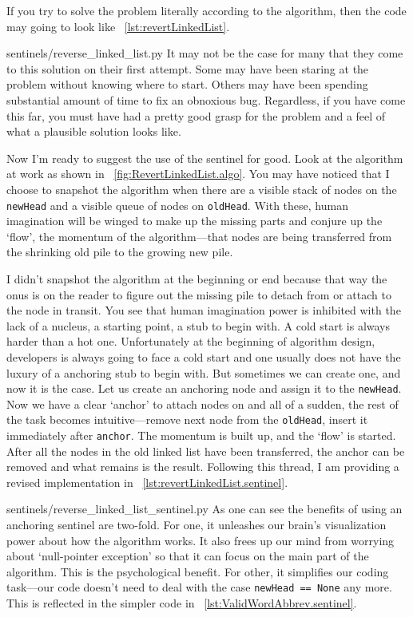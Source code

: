 \documentclass[oneside,11pt]{book}
\theoremstyle{definition}
\theoremstyle{remark}
\newcommand{\code}[1]{\mbox{\lstinline{#1}}}
\begin{document}
If you try to solve the problem literally according to the algorithm,
then the code may going to look like ~\autoref{lst:revertLinkedList}.

{sentinels/reverse_linked_list.py}
It may not be the case for many that they come to this solution on their first attempt.
Some may have been staring at the problem without knowing where to start.
Others may have been spending substantial amount of time to fix an obnoxious bug.
Regardless, if you have come this far, you must have had a pretty good grasp for the problem
and a feel of what a plausible solution looks like.

Now I'm ready to suggest the use of the sentinel for good.
Look at the algorithm at work as shown in ~\autoref{fig:RevertLinkedList.algo}.
You may have noticed that I choose to snapshot the algorithm when there
are a visible stack of nodes on the \code{newHead} and a visible queue of
nodes on \code{oldHead}.
With these, human imagination will be winged to make up the missing parts and
conjure up the `flow', the momentum of the algorithm---that nodes
are being transferred from the shrinking old pile to the growing new pile.

I didn't snapshot the algorithm at the beginning or end because that way the onus is on the reader
to figure out the missing pile to detach from or attach to the node in transit.
You see that human imagination power is inhibited with the lack of a nucleus, a starting point,
a stub to begin with.
A cold start is always harder than a hot one.
Unfortunately at the beginning of algorithm design, developers is always going to face a cold start
and one usually does not have the luxury of a anchoring stub to begin with.
But sometimes we can create one, and now it is the case.
Let us create an anchoring node and assign it to the \code{newHead}.
Now we have a clear `anchor' to attach nodes on and all of a sudden, the rest of the task becomes
intuitive---remove next node from the \code{oldHead}, insert it immediately after \code{anchor}.
The momentum is built up, and the `flow' is started.
After all the nodes in the old linked list have been transferred, the anchor can be removed and
what remains is the result.
Following this thread, I am providing a revised implementation in
~\autoref{lst:revertLinkedList.sentinel}.

{sentinels/reverse_linked_list_sentinel.py}
As one can see the benefits of using an anchoring sentinel are two-fold.
For one, it unleashes our brain's visualization power about how the algorithm works.
It also frees up our mind from worrying about `null-pointer exception' so that it can focus on
the main part of the algorithm.
This is the psychological benefit.
For other, it simplifies our coding task---our code doesn't need to deal with the case
\code{newHead == None} any more.
This is reflected in the simpler code in ~\autoref{lst:ValidWordAbbrev.sentinel}.
\end{document}

